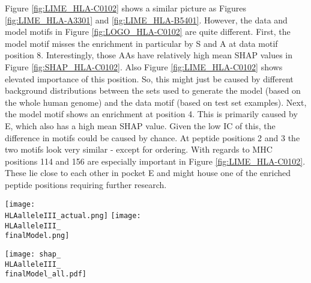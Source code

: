 \documentclass[msc,deptreport,ai]{infthesis} %
\newcommand{\finalModel}{epoch=4-step=3648186}
\newcommand{\HLAalleleI}{HLA-A3301}
\newcommand{\HLAalleleII}{HLA-B5401}
\newcommand{\HLAalleleIII}{HLA-C0102}
\begin{document}
				\noindent \begin{minipage}[c][14cm][t]{8cm}
				\noindent Figure \ref{fig:LIME_\HLAalleleIII} shows a similar picture as Figures \ref{fig:LIME_\HLAalleleI} and \ref{fig:LIME_\HLAalleleII}. However, the data and model motifs in Figure \ref{fig:LOGO_\HLAalleleIII} are quite different. First, the model motif misses the enrichment  in particular by S and A at data motif position 8. Interestingly, those \glspl{AA} have relatively high mean \gls{SHAP} values in Figure \ref{fig:SHAP_\HLAalleleIII}. Also Figure \ref{fig:LIME_\HLAalleleIII} shows elevated importance of this position. So, this might just be caused by different background distributions between the sets used to generate the model (based on the whole human genome) and the data motif (based on test set examples). Next, the model motif shows an enrichment at position 4. This is primarily caused by E, which also has a high mean \gls{SHAP} value. Given the low \gls{IC} of this, the difference in motifs could be caused by chance. At peptide positions 2 and 3 the two motifs look very similar - except for ordering. With regards to \gls{MHC} positions 114 and 156 are especially important in Figure \ref{fig:LIME_\HLAalleleIII}. These lie close to each other in pocket E \cite{van_deutekom_zooming_2015} and might house one of the enriched peptide positions requiring further research.

				\end{minipage}
				\begin{minipage}[r][14cm][t]{6cm}
					\texttt{[image: \\HLAalleleIII\_actual.png]}
					\texttt{[image: \\HLAalleleIII\_\\finalModel.png]} 
					\label{fig:LOGO_\HLAalleleIII}

					\texttt{[image: shap\_\\HLAalleleIII\_\\finalModel\_all.pdf]}
					\label{fig:SHAP_\HLAalleleIII}
				\end{minipage}

				 


\end{document}

